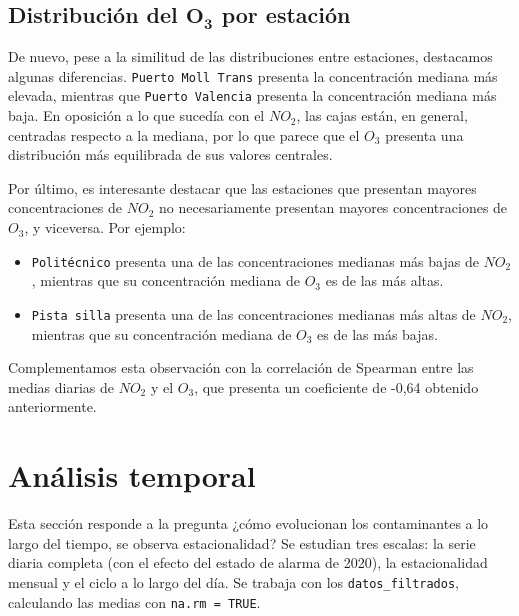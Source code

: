 \documentclass[notspecified,article,submit,oneauthor,pdftex]{Definitions/mdpi}
\begin{document}
\subsection{\texorpdfstring{Distribución del \(\mathbf{O_{3}}\) por
estación}{Distribución del \textbackslash mathbf\{O\_\{3\}\} por estación}}\label{distribuciuxf3n-del-mathbfo_3-por-estaciuxf3n}

De nuevo, pese a la similitud de las distribuciones entre estaciones,
destacamos algunas diferencias. \texttt{Puerto\ Moll\ Trans} presenta la
concentración mediana más elevada, mientras que
\texttt{Puerto\ Valencia} presenta la concentración mediana más baja. En
oposición a lo que sucedía con el \(NO_{2}\), las cajas están, en
general, centradas respecto a la mediana, por lo que parece que el
\(O_{3}\) presenta una distribución más equilibrada de sus valores
centrales.

Por último, es interesante destacar que las estaciones que presentan
mayores concentraciones de \(NO_{2}\) no necesariamente presentan
mayores concentraciones de \(O_{3}\), y viceversa. Por ejemplo:

\begin{itemize}
\item
  \texttt{Politécnico} presenta una de las concentraciones medianas más
  bajas de \(NO_{2}\), mientras que su concentración mediana de
  \(O_{3}\) es de las más altas.
\item
  \texttt{Pista\ silla} presenta una de las concentraciones medianas más
  altas de \(NO_{2}\), mientras que su concentración mediana de
  \(O_{3}\) es de las más bajas.
\end{itemize}

Complementamos esta observación con la correlación de Spearman entre las
medias diarias de \(NO_2\) y el \(O_3\), que presenta un coeficiente de
-0,64 obtenido anteriormente.

\section{Análisis temporal}\label{anuxe1lisis-temporal}

Esta sección responde a la pregunta ¿cómo evolucionan los contaminantes
a lo largo del tiempo, se observa estacionalidad? Se estudian tres
escalas: la serie diaria completa (con el efecto del estado de alarma de
2020), la estacionalidad mensual y el ciclo a lo largo del día. Se
trabaja con los \texttt{datos\_filtrados}, calculando las medias con
\texttt{na.rm\ =\ TRUE}.
\end{document}
